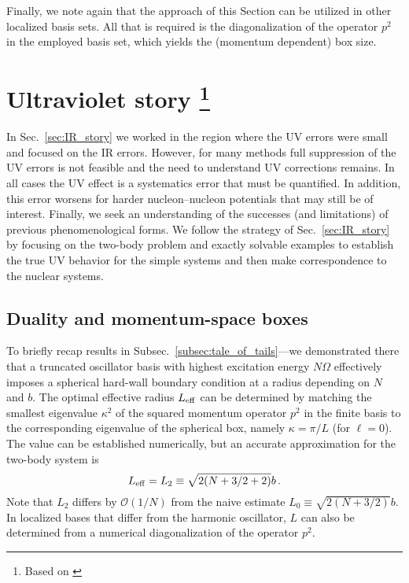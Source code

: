 	Finally, we note again that the approach of this Section can be
	utilized in other localized basis sets.  All that is required is the
	diagonalization of the operator $p^2$ in the employed basis set, which
	yields the (momentum dependent) box size.


	\section[Ultraviolet story]
	{Ultraviolet story \footnote{Based on \cite{Konig:2014hma}}}
	\label{sec:UV_story}

  In Sec.~\ref{sec:IR_story} we worked in the region where the UV errors were
	small and focused on the IR errors.  However, for many methods full
	suppression of the UV errors is not feasible and the need to understand
	UV corrections remains.  In all cases the UV effect is a systematics error
	that must be quantified.  In addition, this error worsens for harder
	nucleon--nucleon potentials	that may still be of interest.  Finally,
	we seek an understanding of
	the successes (and limitations) of previous phenomenological forms.
	We follow the strategy of Sec.~\ref{sec:IR_story} by focusing on the
	two-body problem and exactly solvable examples to establish the true
	UV behavior for the	simple systems and then make correspondence to the
	nuclear systems.

	\subsection{Duality and momentum-space boxes}
	\label{subsec:UV_cutoff_duality}

	To briefly recap results in Subsec.~\ref{subsec:tale_of_tails}---we
	demonstrated there that a
	truncated oscillator basis with highest excitation energy
	$N\Omega$ effectively imposes a spherical hard-wall boundary condition
	at a radius depending on $N$ and $b$.  The optimal effective radius
	$L_{\rm eff}$ can be determined by matching the smallest eigenvalue
	$\kappa^2$ of the squared momentum operator $p^2$ in the finite
	basis to the corresponding eigenvalue of the spherical box, namely
	$\kappa=\pi/L$ (for $\ell=0$).  The value can be established numerically,
	but an accurate approximation for the two-body system is
	\begin{equation}
	\label{eq:L2_def}
	  L_{\rm eff} = L_2\equiv\sqrt{2(N+3/2+2)}b \,.
	\end{equation}
	Note that $L_2$ differs by $\mathcal{O}(1/N)$ from the naive estimate
	$L_0\equiv\sqrt{2(N+3/2)}b$.  In localized bases that differ from the
	harmonic oscillator, $L$ can also be determined from a numerical
	diagonalization of the operator $p^2$.

